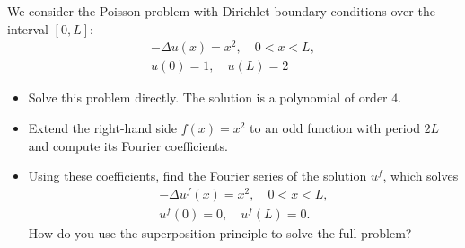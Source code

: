 \documentclass[11pt]{article}
\begin{document}
\begin{solution}
\end{solution}


















\begin{exercise}
    We consider the Poisson problem with Dirichlet boundary conditions over the interval $[0,L]$:
    \begin{gather*}
        - \Delta u(x) = x^2, \quad 0 < x < L,
        \\
        u(0) = 1, \quad u(L) = 2
    \end{gather*}
    \begin{itemize}
        \item Solve this problem directly. The solution is a polynomial of order $4$.
        \item Extend the right-hand side $f(x) = x^2$ to an odd function with period $2L$ and compute its Fourier coefficients.
        \item 
        Using these coefficients, find the Fourier series of the solution $u^f$,
        which solves 
        \begin{gather*}
            - \Delta u^f(x) = x^2, \quad 0 < x < L,
            \\
            u^f(0) = 0, \quad u^f(L) = 0.
        \end{gather*}
        How do you use the superposition principle to solve the full problem? 
    \end{itemize}
\end{exercise}
\end{document}
